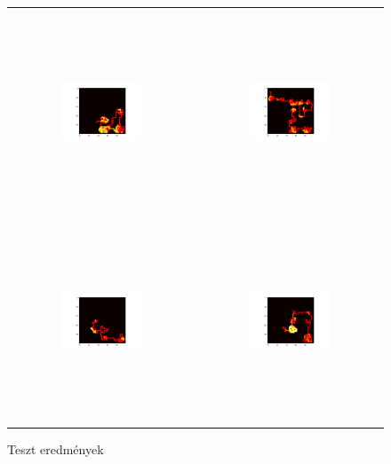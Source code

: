 \begin{figure}[h!]
\begin{center}
\begin{tabular}{cc}
            \\
            \includegraphics[width=0.45\textwidth, height=60mm]{images/test1_agent3.png}    
            & 
            \includegraphics[width=0.45\textwidth, height=60mm]{images/test2_agent3.png}
            \\
            \includegraphics[width=0.45\textwidth, height=60mm]{images/test1_agent4.png}    
            & 
            \includegraphics[width=0.45\textwidth, height=60mm]{images/test2_agent4.png}
            \\
        \end{tabular}
        \caption{Teszt eredmények}
        \label{tbl:tests}
    \end{center}
\end{figure}

